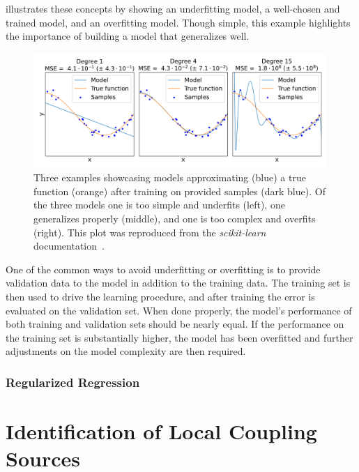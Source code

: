  illustrates these concepts by showing an underfitting model, a well-chosen and trained model, and an overfitting model.
Though simple, this example highlights the importance of building a model that generalizes well.

\begin{figure}[!htb]
    \centering
    \includegraphics*[width=0.99\textwidth]{Figures/ML_for_IR_Coupling/ml_underfitting_overfitting.pdf}
    \caption{Three examples showcasing models approximating (\textcolor{mplblue}{blue}) a true function (\textcolor{mplorange}{orange}) after training on provided samples (\textcolor{mplb}{dark blue}). Of the three models one is too simple and underfits (left), one generalizes properly (middle), and one is too complex and overfits (right). This plot was reproduced from the \textit{scikit-learn}~\cite{CODE:scikit-learn} documentation~\cite{Website:ScikitLearn:Overfitting_Example}.}
    \label{figure:ml_underfitting_overfitting}
\end{figure}

One of the common ways to avoid underfitting or overfitting is to provide validation data to the model in addition to the training data.
The training set is then used to drive the learning procedure, and after training the error is evaluated on the validation set.
When done properly, the model's performance of both training and validation sets should be nearly equal.
If the performance on the training set is substantially higher, the model has been overfitted and further adjustments on the model complexity are then required.

\subsubsection*{Regularized Regression}


\section{Identification of Local Coupling Sources}

